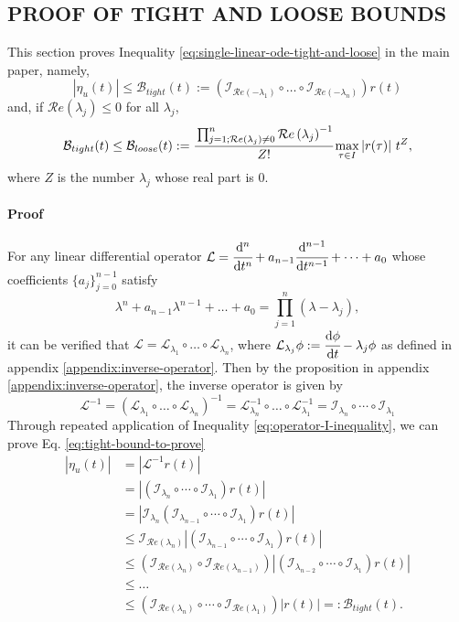 \documentclass[accepted]{uai2023}
\newcommand{\dt}[1]{\cfrac{\mathrm{d} #1}{\mathrm{d} t}}
\newcommand{\dnt}[2]{\cfrac{\mathrm{d}^{#1} #2}{\mathrm{d} t^{#1}}}
\newcommand{\Err}{\eta}
\newcommand{\Bound}{\mathcal{B}}
\renewcommand{\L}{\mathcal{L}}
\newcommand{\I}{\mathcal{I}}
\renewcommand{\Re}[1]{\mathcal{R}e\left(#1\right)}
\begin{document}
\subsection{PROOF OF TIGHT AND LOOSE BOUNDS}
This section proves Inequality \ref{eq:single-linear-ode-tight-and-loose} in the main paper, namely,
\begin{equation}\label{eq:tight-bound-to-prove}
    |\Err_{u}(t)| \leq \Bound_{tight}(t) :=\left(\I_{\Re{-\lambda_1}}\circ\dots\circ\I_{\Re{-\lambda_n}}\right)r(t)
\end{equation}
and, if $\Re{\lambda_j} \leq 0$ for all $\lambda_j$, 
\begin{equation}\label{eq:loose-bound-to-prove}
    \Bound_{tight}(t) \leq \Bound_{loose}(t) := \cfrac{\prod_{j=1; \Re{\lambda_j} \neq 0}^n \Re{\lambda_j}^{-1} }{Z!} \max_{\tau\in I}\left|r(\tau)\right|\, t^{Z},
\end{equation}
where $Z$ is the number $\lambda_j$ whose real part is $0$.

\paragraph{Proof} For any linear differential operator $\L=\dnt{n}{} + a_{n-1}\dnt{n-1}{}+\dots+a_0$ whose coefficients $\{a_j\}_{j=0}^{n-1}$ satisfy 
\[
    \lambda^n + a_{n-1}\lambda^{n-1} + \dots +a_0 = \prod_{j=1}^{n} \left(\lambda - \lambda_j\right),
\]
it can be verified that $\L = \L_{\lambda_1} \circ\dots \circ \L_{\lambda_n}$, where $\L_{\lambda_j}\phi := \dt{\phi}-\lambda_j\phi$ as defined in appendix \ref{appendix:inverse-operator}. Then by the proposition in appendix \ref{appendix:inverse-operator}, the inverse operator is given by
\begin{equation}
    \L^{-1} = \left(\L_{\lambda_1} \circ\dots \circ \L_{\lambda_n}\right)^{-1} = \L_{\lambda_n}^{-1} \circ\dots \circ \L_{\lambda_1}^{-1} = \I_{\lambda_n} \circ\cdots\circ\I_{\lambda_1}
\end{equation}
Through repeated application of Inequality \ref{eq:operator-I-inequality}, we can prove Eq. \ref{eq:tight-bound-to-prove}
\begin{align}
    \left|\Err_{u}(t)\right| &= \left| \L^{-1} r(t) \right| \\
    &=\left|\left(\I_{\lambda_n} \circ\cdots\circ\I_{\lambda_1}\right) r(t)\right| \\
    &=\left|\I_{\lambda_n}\left(\I_{\lambda_{n-1}} \circ\cdots\circ\I_{\lambda_1}\right) r(t)\right| \\
    &\leq \I_{\Re{\lambda_n}}\left|\left(\I_{\lambda_{n-1}} \circ\cdots\circ\I_{\lambda_1}\right) r(t)\right| \\
    &\leq \left(\I_{\Re{\lambda_n}}\circ \I_{\Re{\lambda_{n-1}}}\right)\left|\left(\I_{\lambda_{n-2}} \circ\cdots\circ\I_{\lambda_1}\right) r(t)\right| \\
    &\leq \dots \nonumber \\
    &\leq \left(\I_{\Re{\lambda_n}}\circ \cdots \circ\I_{\Re{\lambda_{1}}}\right)\left|r(t)\right| =: \Bound_{tight}(t).
\end{align}
\end{document}
